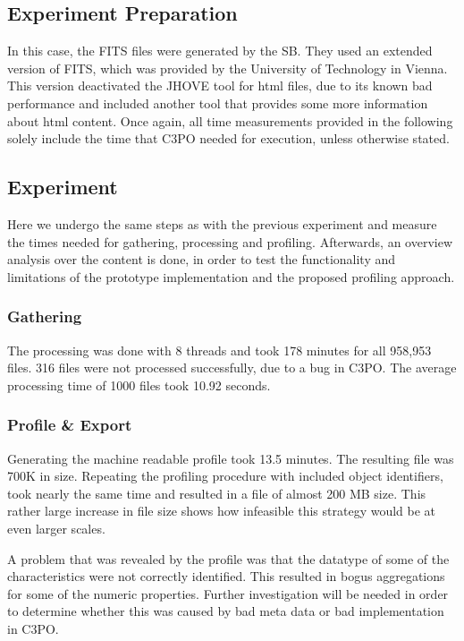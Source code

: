 \subsection{Experiment Preparation}
In this case, the FITS files were generated by the SB. They used an extended version of FITS, which was provided by the University of Technology in Vienna.
This version deactivated the JHOVE tool for html files, due to its known bad performance and  included another tool that provides some more information about html content.
Once again, all time measurements provided in the following solely include the time that C3PO needed for execution, unless otherwise stated.

\subsection{Experiment}
Here we undergo the same steps as with the previous experiment and measure the times needed for gathering, processing and profiling.
Afterwards, an overview analysis over the content is done, in order to test the functionality and limitations of the prototype implementation and the proposed profiling approach.

\subsubsection{Gathering}
The processing was done with 8 threads and took 178 minutes for  all 958,953 files. 316 files were not processed successfully, due to a bug in C3PO. The average processing time of 1000 files took 10.92 seconds. 

\subsubsection{Profile \& Export}
Generating the machine readable profile took 13.5 minutes. The resulting file was 700K in size. Repeating the profiling procedure with included object identifiers, took nearly the same time and resulted in a file of almost 200 MB size. This rather large increase in file size shows how infeasible this strategy would be at even larger scales.

A problem that was revealed by the profile was that the datatype of some of the characteristics were not correctly identified. This resulted in bogus aggregations for some of the numeric properties. Further investigation will be needed in order to determine whether this was caused by bad meta data or bad implementation in C3PO.

